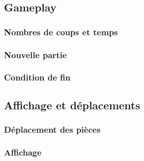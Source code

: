 \documentclass[]{article}
\begin{document}

\subsection{Gameplay}
\subsubsection{Nombres de coups et temps}
\subsubsection{Nouvelle partie}
\subsubsection{Condition de fin}


\subsection{Affichage et déplacements}
\subsubsection{Déplacement des pièces}
\subsubsection{Affichage}


\newpage
\tableofcontents
\end{document}
